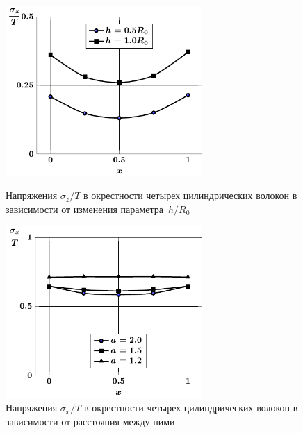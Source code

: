 \begin{russian}
%

\begin{figure}[h!]
\centering\footnotesize
\parbox[b]{7.5cm}{\centering\includegraphics[width=7.5cm]{inclusion-4-z-h.pdf}
\caption{Напряжения $\sigma_z/T$ в окрестности четырех цилиндрических волокон в зависимости от изменения параметра~$h/R_0$
\label{f:7:54}}}\hfil\hfil
\parbox[b]{7.5cm}{\centering\includegraphics[width=7.5cm]{inclusion-4-x-a.pdf}
\caption{Напряжения $\sigma_x/T$ в окрестности четырех цилиндрических волокон в зависимости от расстояния между ними
\label{f:7:55}}}
\end{figure}

%


\end{russian}
